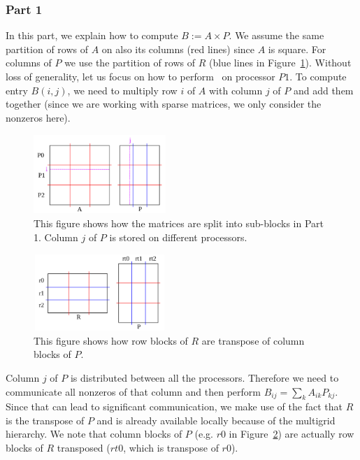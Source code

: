 \subsubsection{Part 1}

In this part, we explain how to compute $B := A \times P$. We assume the same partition of rows of $A$ on also its columns (red lines) since $A$ is square. For columns of $P$ we use the partition of rows of $R$ (blue lines in Figure~\ref{fig:part1b}).
Without loss of generality, let us focus on how to perform \mm ~on processor $P1$. To compute entry $B(i, j)$, we need to multiply row $i$ of $A$ with column $j$ of $P$ and add them together (since we are working with sparse matrices, we only consider the nonzeros here).

\begin{figure}[tbh]
    \centering
    \includegraphics[width=5cm,height=3cm]{./figures/part1b.pdf}
    \caption{This figure shows how the matrices are split into sub-blocks in Part 1. Column $j$ of $P$ is stored on different processors.}
    \label{fig:part1b}
    \Description{}
\end{figure}

\begin{figure}[tbh]
    \centering
    \includegraphics[width=5cm,height=2.9cm]{./figures/part1c.pdf}
    \caption{This figure shows how row blocks of $R$ are transpose of column blocks of $P$.}
    \label{fig:part1c}
    \Description{}
\end{figure}

Column $j$ of $P$ is distributed between all the processors. Therefore we need to communicate all nonzeros of that column and then perform $B_{ij} = \sum_{k} A_{ik} P_{kj}$. Since that can lead to significant communication, we make use of the fact that $R$ is the transpose of $P$ and is already available locally because of the multigrid hierarchy. We note that column blocks of $P$ (e.g. $r0$ in Figure~\ref{fig:part1c}) are actually row blocks of $R$ transposed ($rt0$, which is transpose of $r0$).

